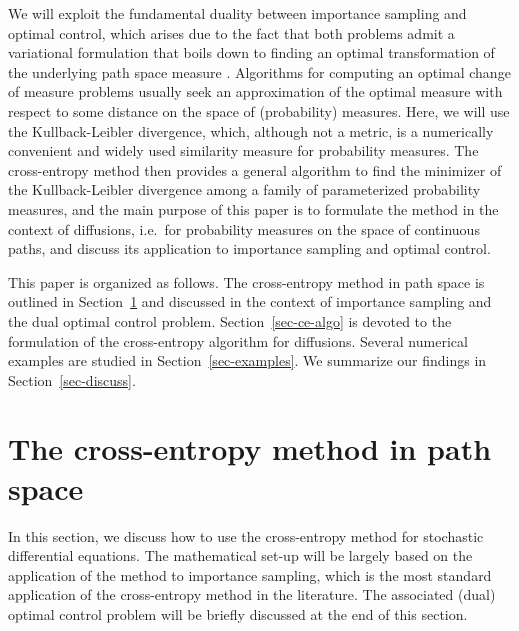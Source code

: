\documentclass[final]{siamltex}
\newcommand{\wrt}{with respect to }
\begin{document}

We will exploit the fundamental duality between importance sampling and optimal control, which arises due to the fact that both problems admit a variational formulation that boils down to finding an optimal transformation of the underlying path space measure \cite{WangDupuis2004}. Algorithms for computing an optimal change of measure problems usually seek an approximation of the optimal measure \wrt some distance on the space of (probability) measures. Here, we will use the Kullback-Leibler 
divergence, which, although not a metric, is a numerically convenient and widely used similarity measure for probability measures. 
The cross-entropy method then provides a general algorithm to find the minimizer of the
Kullback-Leibler divergence among a family of parameterized
probability measures, and the main purpose of this paper is to formulate the 
method in the context of diffusions, i.e.~for probability measures on the space of continuous paths, and discuss 
its application to importance sampling and optimal control.

This paper is organized as follows. The cross-entropy method in path space is
outlined in Section~\ref{sec-ce-is} and discussed in the context of importance
sampling and the dual optimal control problem. Section~\ref{sec-ce-algo} is
devoted to the formulation of the cross-entropy algorithm for diffusions. Several numerical examples are studied in Section~\ref{sec-examples}. We summarize our findings in Section~\ref{sec-discuss}.


\section{The cross-entropy method in path space}
\label{sec-ce-is}
In this section, we discuss how to use the cross-entropy
method for stochastic differential equations. The mathematical set-up will be largely based on the application of the method to importance sampling, which is the most standard application of the cross-entropy method in the literature. The associated (dual) optimal control problem will be briefly discussed at the end of this section. 
\end{document}
